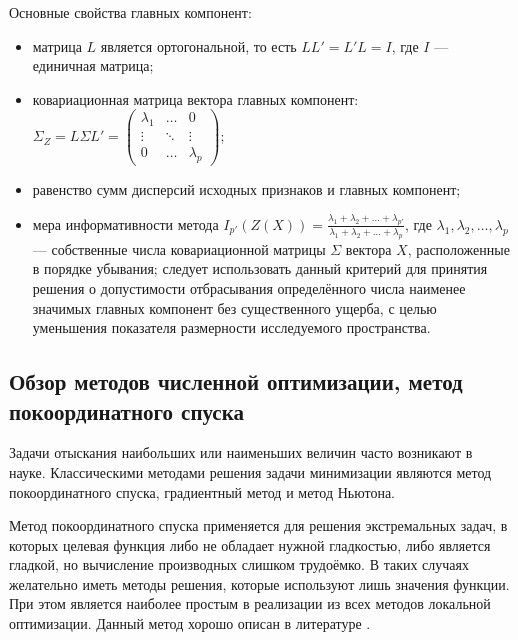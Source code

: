 Основные свойства главных компонент:
\begin{itemize}
	\item матрица $L$ является ортогональной, то есть $L L' = L' L = I$, где $I$ --- единичная матрица; 
	\item ковариационная матрица вектора главных компонент: $\Sigma_{Z} = L \Sigma L' = \begin{pmatrix} \lambda_1 & \dots & 0 \\ \vdots & \ddots & \vdots \\ 0 & \dots & \lambda_p \end{pmatrix}$;
	\item равенство сумм дисперсий исходных признаков и главных компонент;
	\item мера информативности метода $I_{p'}(Z(X)) = \frac{\lambda_1 + \lambda_2 + \dots + \lambda_{p'}}{\lambda_1 + \lambda_2 + \dots + \lambda_p}$, где $\lambda_1, \lambda_2, \dots, \lambda_p$ --- собственные числа ковариационной матрицы $\Sigma$ вектора $X$, расположенные в порядке убывания;
	следует использовать данный критерий для принятия решения о допустимости отбрасывания определённого числа наименее значимых главных компонент без существенного ущерба, с целью уменьшения показателя размерности исследуемого пространства.	
\end{itemize}


\subsection{Обзор методов численной оптимизации, метод покоординатного спуска} \label{sect1_4_4}

Задачи отыскания наибольших или наименьших величин часто возникают в науке.
Классическими методами решения задачи минимизации являются метод покоординатного спуска, градиентный метод и метод Ньютона. 

Метод покоординатного спуска применяется для решения экстремальных задач, в которых целевая функция либо не обладает нужной гладкостью, либо является гладкой, но вычисление производных слишком трудоёмко.
В таких случаях желательно иметь методы решения, которые используют лишь значения функции.
При этом является наиболее простым в реализации из всех методов локальной оптимизации.
Данный метод хорошо описан в литературе \cite{alekseeva2008}.

